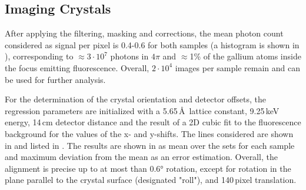 \subsection{Imaging Crystals}

After applying the filtering, masking and corrections, the mean photon count considered as signal per pixel is 0.4-0.6 for both samples (a histogram is shown in ), corresponding to $\approx 3\cdot10^7$ photons in $4\pi$ and $\approx$1\% of the gallium atoms inside the focus emitting fluorescence. Overall, $2\cdot10^4$ images per sample remain and can be used for further analysis.

For the determination of the crystal orientation and detector offsets, the regression parameters are initialized with a 5.65\,\AA\, lattice constant, 9.25\,keV energy, 14\,cm detector distance and the result of a 2D cubic fit to the fluorescence background for the values of the x- and y-shifts. The  lines considered are shown in  and listed in . The results are shown in  as mean over the sets for each sample and maximum deviation from the mean as an error estimation. Overall, the alignment is precise up to at most than 0.6° rotation, except for rotation in the plane parallel to the crystal surface (designated "roll"), and 140\,pixel translation.

